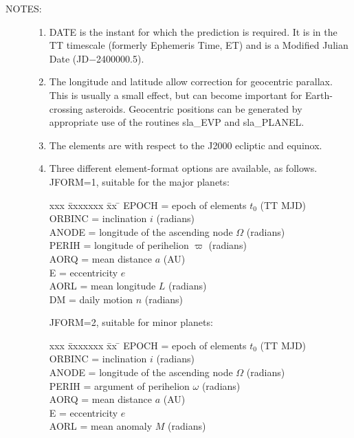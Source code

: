 \documentclass[11pt,twoside]{article}
\newlength{\oldspacing}
\newcommand{\notes}[1]
{
  \goodbreak
  \setlength{\oldspacing}{\topsep}
  \setlength{\topsep}{0.3ex}
  \begin{description}
    \item[NOTES]:
        #1
  \end{description}
  \setlength{\topsep}{\oldspacing}
}
\renewcommand{\notes}[1]
   {
      \begin{description}
         \item[NOTES:]
            #1
      \end{description}
   }
\begin{document}
\notes
{
 \begin{enumerate}
  \item DATE is the instant for which the prediction is
        required.  It is in the TT timescale (formerly
        Ephemeris Time, ET) and is a
        Modified Julian Date (JD$-$2400000.5).
  \item The longitude and latitude allow correction for geocentric
        parallax.  This is usually a small effect, but can become
        important for Earth-crossing asteroids.  Geocentric positions
        can be generated by appropriate use of the routines
        sla\_EVP and sla\_PLANEL.
  \item The elements are with respect to the J2000 ecliptic and equinox.
  \item Three different element-format options are available, as
        follows. \\

        JFORM=1, suitable for the major planets:

        \begin{tabbing}
        xxx \= xxxxxxx \= xx \= \kill
        \> EPOCH  \> = \> epoch of elements $t_0$ (TT MJD) \\
        \> ORBINC \> = \> inclination $i$ (radians) \\
        \> ANODE  \> = \> longitude of the ascending node $\Omega$ (radians) \\
        \> PERIH  \> = \> longitude of perihelion $\varpi$ (radians) \\
        \> AORQ   \> = \> mean distance $a$ (AU) \\
        \> E      \> = \> eccentricity $e$ \\
        \> AORL   \> = \> mean longitude $L$ (radians) \\
        \> DM     \> = \> daily motion $n$ (radians)
        \end{tabbing}

        JFORM=2, suitable for minor planets:

        \begin{tabbing}
        xxx \= xxxxxxx \= xx \= \kill
        \> EPOCH  \> = \> epoch of elements $t_0$ (TT MJD) \\
        \> ORBINC \> = \> inclination $i$ (radians) \\
        \> ANODE  \> = \> longitude of the ascending node $\Omega$ (radians) \\
        \> PERIH  \> = \> argument of perihelion $\omega$ (radians) \\
        \> AORQ   \> = \> mean distance $a$ (AU) \\
        \> E      \> = \> eccentricity $e$ \\
        \> AORL   \> = \> mean anomaly $M$ (radians)
        \end{tabbing}


\end{enumerate}}
\end{document}
